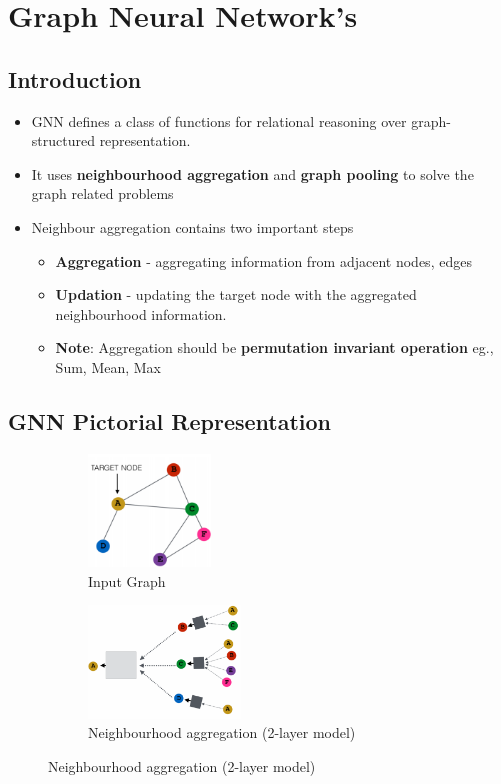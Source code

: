 \chapter{Graph Neural Network's}

\section{Introduction}
    \begin{itemize}
        \item GNN defines a class of functions for relational reasoning over graph-structured representation.
        \item It uses \textbf{neighbourhood aggregation} and \textbf{graph pooling} to solve the graph related problems
        \item Neighbour aggregation contains two important steps
        \begin{itemize}
            \item \textbf{Aggregation} - aggregating information from adjacent nodes, edges
            \item \textbf{Updation} - updating the target node with the aggregated neighbourhood information.
            \item \textbf{Note}: Aggregation should be \textbf{permutation invariant operation} eg., Sum, Mean, Max
        \end{itemize}
    \end{itemize}
    
\section{GNN Pictorial Representation}
    \begin{figure}[h]
    \centering
    \begin{subfigure}[b]{0.3\textwidth}
                \includegraphics[width=\textwidth,height=3cm]{tex/img/Eggraph.png}
                \caption{Input Graph}
        \end{subfigure}%
        \hfill
    \begin{subfigure}[b]{0.5\textwidth}
                \includegraphics[width=\textwidth,height=3cm]{tex/img/GNNmodel.png}
                \caption{Neighbourhood aggregation (2-layer model)}
       \end{subfigure}%
    \end{figure}

